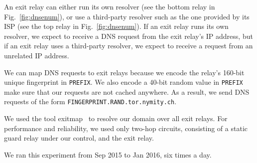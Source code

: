 An exit relay can either run its own resolver (see the bottom relay in
Fig.~\ref{fig:dnsenum}), or use a third-party resolver such as the one provided
by its ISP (see the top relay in Fig.~\ref{fig:dnsenum}).  If an exit relay runs
its own resolver, we expect to receive a DNS request from the exit relay's IP
address, but if an exit relay uses a third-party resolver, we expect to receive
a request from an unrelated IP address.

We can map DNS requests to exit relays because we encode the relay's 160-bit
unique fingerprint in \texttt{PREFIX}.  We also encode a 40-bit random value in
\texttt{PREFIX} make sure that our requests are not cached anywhere.  As a
result, we send DNS requests of the form
\texttt{FINGERPRINT.RAND.tor.nymity.ch}.

We used the tool exitmap~\cite{Winter2014b} to resolve our domain over all exit
relays.  For performance and reliability, we used only two-hop circuits,
consisting of a static guard relay under our control, and the exit relay.

We ran this experiment from Sep 2015 to Jan 2016, six times a day.


